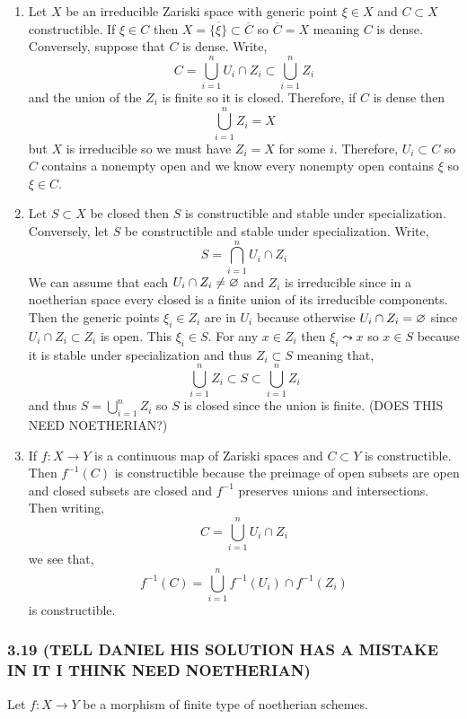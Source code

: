 \documentclass[12pt]{article}
\begin{document}
\begin{enumerate}
\item Let $X$ be an irreducible Zariski space with generic point $\xi \in X$ and $C \subset X$ constructible. If $\xi \in C$ then $X = \overline{ \{ \xi \} } \subset \overline{C}$ so $\overline{C} = X$ meaning $C$ is dense. Conversely, suppose that $C$ is dense. Write,
\[ C = \bigcup_{i = 1}^n U_i \cap Z_i \subset \bigcup_{i = 1}^n Z_i \]
and the union of the $Z_i$ is finite so it is closed. Therefore, if $C$ is dense then 
\[ \bigcup_{i = 1}^n Z_i = X \]
but $X$ is irreducible so we must have $Z_i = X$ for some $i$. Therefore, $U_i \subset C$ so $C$ contains a nonempty open and we know every nonempty open contains $\xi$ so $\xi \in C$.

\item Let $S \subset X$ be closed then $S$ is constructible and stable under specialization. Conversely, let $S$ be constructible and stable under specialization. Write,
\[ S = \bigcap_{i = 1}^n U_i \cap Z_i \]
We can assume that each $U_i \cap Z_i \neq \varnothing$ and $Z_i$ is irreducible since in a noetherian space every closed is a finite union of its irreducible components. Then the generic points $\xi_i \in Z_i$ are in $U_i$ because otherwise $U_i \cap Z_i = \varnothing$ since $U_i \cap Z_i \subset Z_i$ is open. This $\xi_i \in S$. For any $x \in Z_i$ then $\xi_i \leadsto x$ so $x \in S$ because it is stable under specialization and thus $Z_i \subset S$ meaning that,
\[ \bigcup_{i = 1}^n Z_i \subset S \subset \bigcup_{i = 1}^n Z_i \]
and thus $S = \bigcup_{i = 1}^n Z_i$ so $S$ is closed since the union is finite. (DOES THIS NEED NOETHERIAN?)

\item If $f : X \to Y$ is a continuous map of Zariski spaces and $C \subset Y$ is constructible. Then $f^{-1}(C)$ is constructible because the preimage of open subsets are open and closed subsets are closed and $f^{-1}$ preserves unions and intersections. Then writing,
\[ C = \bigcup_{i = 1}^n U_i \cap Z_i \]
we see that,
\[ f^{-1}(C) = \bigcup_{i = 1}^n f^{-1}(U_i) \cap f^{-1}(Z_i) \]
is constructible. 
\end{enumerate}

\subsubsection{3.19 (TELL DANIEL HIS SOLUTION HAS A MISTAKE IN IT I THINK NEED NOETHERIAN)}

Let $f : X \to Y$ be a morphism of finite type of noetherian schemes. 
\end{document}
